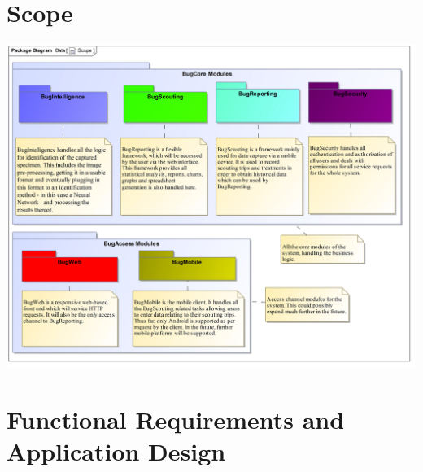 \documentclass[11pt,a4paper,titlepage]{article}
\begin{document}
\section{Scope}
\includegraphics[width=\linewidth]{scope}

\section{Functional Requirements and Application Design}
\end{document}

